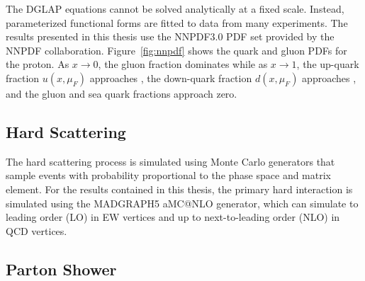 The DGLAP equations cannot be solved analytically at a fixed scale.
Instead, parameterized functional forms are fitted to data from many experiments.  
The results presented in this thesis use the NNPDF3.0 PDF set provided by the NNPDF collaboration.
Figure~\ref{fig:nnpdf} shows the quark and gluon PDFs for the proton.
As $x \rightarrow 0$, the gluon fraction dominates while as $x \rightarrow 1$, the up-quark fraction $u(x, \mu_F)$ approaches , the down-quark fraction $d(x, \mu_F)$ approaches , and the gluon and sea quark fractions approach zero.

\subsection{Hard Scattering}

The hard scattering process is simulated using Monte Carlo generators that sample events with probability proportional to the phase space and matrix element.
For the results contained in this thesis, the primary hard interaction is simulated using the MADGRAPH5 aMC@NLO generator, which can simulate to leading order (LO) in EW vertices and up to next-to-leading order (NLO) in QCD vertices.

\subsection{Parton Shower}

